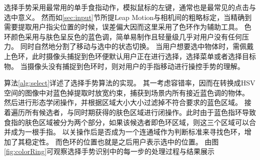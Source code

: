 选择手势采用最常用的单手食指动作，模拟鼠标的左键，通常也是最常见的点击与选中意义。
然而如\ref{sec:input}节所提Leap Motion与相机间的粗略标定，当精确到需要提取用户指尖位置的时候，误差偏大因而这里采用了色环作为辅助工具。
色环颜色采用与肤色呈反色的蓝色调，简单易制作且轻量级几乎对用户没有任何压力。
同时自然地分割了移动与选中的状态切换。
当用户想要选中物体时，需佩戴上色环，此时摄像头捕捉到色环便默认用户正在进行选择，选择菜单或者选择目标物。
当摄像头没有捕捉到色环时，则对用户的手指移动进行操控手势的理解。

算法\ref{alg:select}详述了选择手势算法的实现。
其一考虑容错率，因而在转换成HSV空间的图像中对蓝色掉提取时放宽约束，捕获到场景内所有接近蓝色调的物体。
然后进行形态学闭操作，并根据区域大小大小过滤掉不符合要求的蓝色区域。
接着遍历所有候选者，与同时期获得的肤色区域进行闭操作。此时由于蓝色指环导致食指的肤色区域被分为两个部分，如果该候选者即色环区域，则这三个区域可以合并成为一根手指。
以关操作后是否成为一个连通域作为判断标准来寻找色环，增加了其稳定性。
而色环的位置也就是之后用户表示选中的位置。
由图\ref{fig:colorRing}可观察选择手势识别中的每一步的处理过程与结果展示


